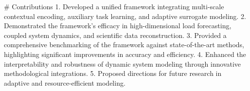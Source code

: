 # Contributions  
1. Developed a unified framework integrating multi-scale contextual encoding, auxiliary task learning, and adaptive surrogate modeling.  
2. Demonstrated the framework's efficacy in high-dimensional load forecasting, coupled system dynamics, and scientific data reconstruction.  
3. Provided a comprehensive benchmarking of the framework against state-of-the-art methods, highlighting significant improvements in accuracy and efficiency.  
4. Enhanced the interpretability and robustness of dynamic system modeling through innovative methodological integrations.  
5. Proposed directions for future research in adaptive and resource-efficient modeling.  

